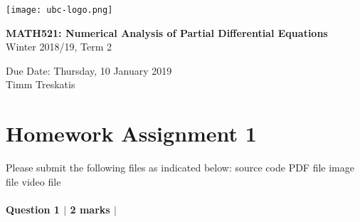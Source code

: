 \documentclass[10pt,letterpaper]{scrartcl}
\begin{document}
\begin{minipage}{.2\textwidth}
\texttt{[image: ubc-logo.png]}
\end{minipage}
\hfill
\begin{minipage}{.75\textwidth}
\setlength{\parskip}{6pt}
\begin{flushright}
{
\sffamily
\textbf{MATH521: Numerical Analysis of Partial Differential Equations}\\
Winter 2018/19, Term 2

Due Date: Thursday, 10 January 2019\\
Timm Treskatis
}
\end{flushright}
\end{minipage}

\section*{Homework Assignment 1}

Please submit the following files as indicated below: \hfill \faFileCodeO \: source code \hfill \faFilePdfO \: PDF file \hfill \faFilePictureO \: image file \hfill \faFileMovieO \: video file

\paragraph*{Question 1 $\vert$ 2 marks $\vert$ \faFilePdfO}
\end{document}
